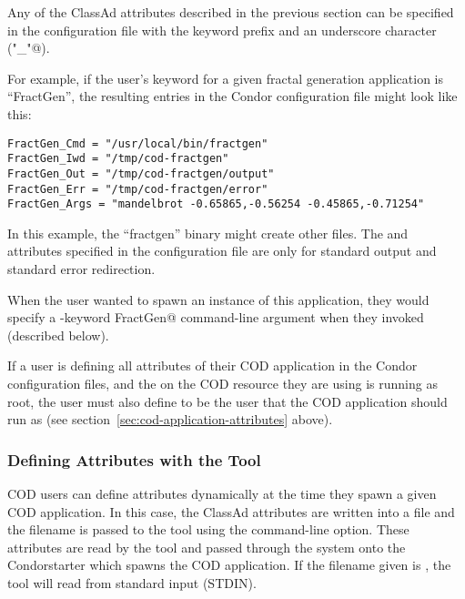 Any of the ClassAd attributes described in the previous section can be
specified in the configuration file with the keyword prefix and an
underscore character (\verb@"_"@).

For example, if the user's keyword for a given fractal generation
application is ``FractGen'', the resulting entries in the Condor
configuration file might look like this:

\begin{verbatim}
FractGen_Cmd = "/usr/local/bin/fractgen"
FractGen_Iwd = "/tmp/cod-fractgen"
FractGen_Out = "/tmp/cod-fractgen/output"
FractGen_Err = "/tmp/cod-fractgen/error"
FractGen_Args = "mandelbrot -0.65865,-0.56254 -0.45865,-0.71254"
\end{verbatim}

In this example, the ``fractgen'' binary might create other files.
The  and  attributes specified in the
configuration file are only for standard output and standard error
redirection.

When the user wanted to spawn an instance of this application, they
would specify a \verb@-keyword FractGen@ command-line argument when
they invoked  (described below).

\Note If a user is defining all attributes of their COD application in
the Condor configuration files, and the  on the COD
resource they are using is running as root, the user must also define
 to be the user that the COD application should run as
(see section~\ref{sec:cod-application-attributes} above). 


\subsubsection{\label{sec:cod-command-line-attrs}
Defining Attributes with the  Tool} 

COD users can define attributes dynamically at the time they spawn a
given COD application.
In this case, the ClassAd attributes are written into a file and the
filename is passed to the  tool using the
 command-line option.
These attributes are read by the  tool and passed through
the system onto the Condor{starter} which spawns the COD application. 
If the filename given is \File{-}, the  tool will read
from standard input (STDIN).

